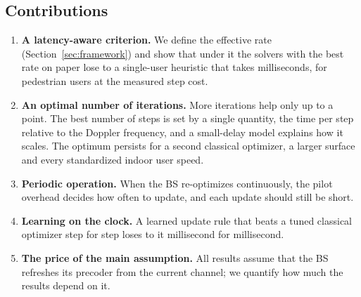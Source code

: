 \subsection{Contributions}
\begin{enumerate}
    \item \textbf{A latency-aware criterion.} We define the effective rate (Section~\ref{sec:framework}) and show that under it the solvers with the best rate on paper lose to a single-user heuristic that takes milliseconds, for pedestrian users at the measured step cost.
    \item \textbf{An optimal number of iterations.} More iterations help only up to a point. The best number of steps is set by a single quantity, the time per step relative to the Doppler frequency, and a small-delay model explains how it scales. The optimum persists for a second classical optimizer, a larger surface and every standardized indoor user speed.
    \item \textbf{Periodic operation.} When the BS re-optimizes continuously, the pilot overhead decides how often to update, and each update should still be short.
    \item \textbf{Learning on the clock.} A learned update rule that beats a tuned classical optimizer step for step loses to it millisecond for millisecond.
    \item \textbf{The price of the main assumption.} All results assume that the BS refreshes its precoder from the current channel; we quantify how much the results depend on it.
\end{enumerate}
